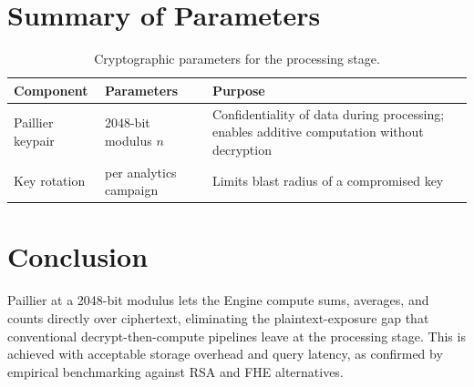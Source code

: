 \documentclass[11pt]{article}
\begin{document}
\section{Summary of Parameters}
\begin{table}[h]
\centering
\small
\renewcommand{\arraystretch}{1.3}
\begin{tabularx}{\textwidth}{L{3cm} L{3cm} X}
\toprule
\textbf{Component} & \textbf{Parameters} & \textbf{Purpose} \\
\midrule
Paillier keypair & 2048-bit modulus $n$ & Confidentiality of data during processing; enables additive computation without decryption \\
Key rotation & per analytics campaign & Limits blast radius of a compromised key \\
\bottomrule
\end{tabularx}
\caption{Cryptographic parameters for the processing stage.}
\end{table}

\section{Conclusion}
Paillier at a 2048-bit modulus lets the Engine compute sums, averages, and counts directly over ciphertext, eliminating the plaintext-exposure gap that conventional decrypt-then-compute pipelines leave at the processing stage. This is achieved with acceptable storage overhead and query latency, as confirmed by empirical benchmarking against RSA and FHE alternatives.
\end{document}

